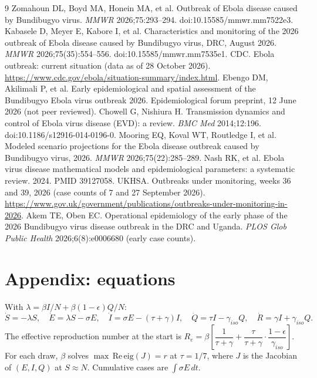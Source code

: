 \documentclass[10pt,a4paper]{article}
\begin{document}
\begin{thebibliography}{9}\small\setlength{\itemsep}{0pt}
 Zomahoun DL, Boyd MA, Honein MA, et al. Outbreak of Ebola disease caused by Bundibugyo virus. \emph{MMWR} 2026;75:293--294. doi:10.15585/mmwr.mm7522e3.
 Kabasele D, Meyer E, Kabore I, et al. Characteristics and monitoring of the 2026 outbreak of Ebola disease caused by Bundibugyo virus, DRC, August 2026. \emph{MMWR} 2026;75(35):554--556. doi:10.15585/mmwr.mm7535e1.
 CDC. Ebola outbreak: current situation (data as of 28 October 2026). \url{https://www.cdc.gov/ebola/situation-summary/index.html}.
 Ebengo DM, Akilimali P, et al. Early epidemiological and spatial assessment of the Bundibugyo Ebola virus outbreak 2026. Epidemiological forum preprint, 12 June 2026 (not peer reviewed).
 Chowell G, Nishiura H. Transmission dynamics and control of Ebola virus disease (EVD): a review. \emph{BMC Med} 2014;12:196. doi:10.1186/s12916-014-0196-0.
 Mooring EQ, Koval WT, Routledge I, et al. Modeled scenario projections for the Ebola disease outbreak caused by Bundibugyo virus, 2026. \emph{MMWR} 2026;75(22):285--289.
 Nash RK, et al. Ebola virus disease mathematical models and epidemiological parameters: a systematic review. 2024. PMID 39127058.
 UKHSA. Outbreaks under monitoring, weeks 36 and 39, 2026 (case counts of 7 and 27 September 2026). \url{https://www.gov.uk/government/publications/outbreaks-under-monitoring-in-2026}.
 Akem TE, Oben EC. Operational epidemiology of the early phase of the 2026 Bundibugyo virus disease outbreak in the DRC and Uganda. \emph{PLOS Glob Public Health} 2026;6(8):e0006680 (early case counts).
\end{thebibliography}

\appendix
\section*{Appendix: equations}
\small With $\lambda=\beta I/N+\beta(1-\epsilon)Q/N$:
\[
\dot S=-\lambda S,\quad \dot E=\lambda S-\sigma E,\quad \dot I=\sigma E-(\tau+\gamma)I,\quad \dot Q=\tau I-\gamma_{iso}Q,\quad \dot R=\gamma I+\gamma_{iso}Q .
\]
The effective reproduction number at the start is $R_e=\beta\left[\dfrac{1}{\tau+\gamma}+\dfrac{\tau}{\tau+\gamma}\cdot\dfrac{1-\epsilon}{\gamma_{iso}}\right]$. For each draw, $\beta$ solves $\max\,\mathrm{Re}\,\mathrm{eig}(J)=r$ at $\tau=1/7$, where $J$ is the Jacobian of $(E,I,Q)$ at $S\approx N$. Cumulative cases are $\int\sigma E\,dt$.
\end{document}
